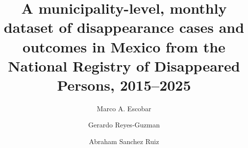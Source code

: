 \documentclass[3p]{elsarticle}
\begin{document}
\begin{frontmatter}

\title{A municipality-level, monthly dataset of disappearance cases and outcomes
in Mexico from the National Registry of Disappeared Persons, 2015--2025}

\author[inst1]{Marco A. Escobar}
\author[inst2]{Gerardo Reyes-Guzman}
\author[inst3]{Abraham Sanchez Ruiz}

\address[inst1]{Facultad de Ingenierías y Tecnologías, Universidad La Salle Bajío,
  León, Guanajuato 37150, Mexico}
\address[inst2]{Facultad de Economía, Benemérita Universidad Autónoma de Puebla,
  Puebla, Puebla 72570, Mexico}
\address[inst3]{Facultad de Estudios Superiores, Universidad La Salle Bajío,
  Salamanca, Guanajuato 37000, Mexico}


\begin{abstract}                                                                                                                                                                            
                                                                                                                                                                                            

\end{abstract}
\end{frontmatter}
\end{document}
